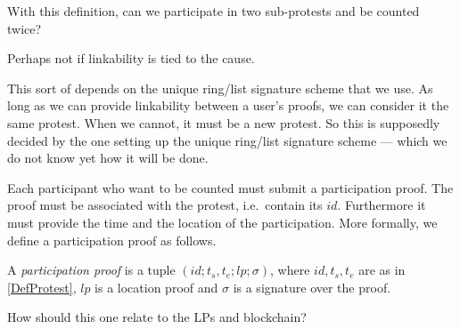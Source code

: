 \begin{frame}
\begin{question}
  With this definition, can we participate in two sub-protests and be counted 
  twice?
\end{question}
\begin{remark}
  Perhaps not if linkability is tied to the cause.
\end{remark}
\end{frame}
\begin{remark}
  This sort of depends on the unique ring/list signature scheme that we use.
  As long as we can provide linkability between a user's proofs, we can consider 
  it the same protest.
  When we cannot, it must be a new protest.
  So this is supposedly decided by the one setting up the unique ring/list 
  signature scheme --- which we do not know yet how it will be done.
\end{remark}

Each participant who want to be counted must submit a participation proof.
The proof must be associated with the protest, i.e.\ contain its \(id\).
Furthermore it must provide the time and the location of the participation.
More formally, we define a participation proof as follows.

\begin{definition}
  A \emph{participation proof} is a tuple \((id; t_s, t_e; lp; \sigma)\), where
  \(id, t_s, t_e\) are as in \cref{DefProtest},
  \(lp\) is a location proof and
  \(\sigma\) is a signature over the proof.
\end{definition}

\begin{frame}
\begin{question}
  How should this one relate to the \acp{LP} and blockchain?
\end{question}
\end{frame}

